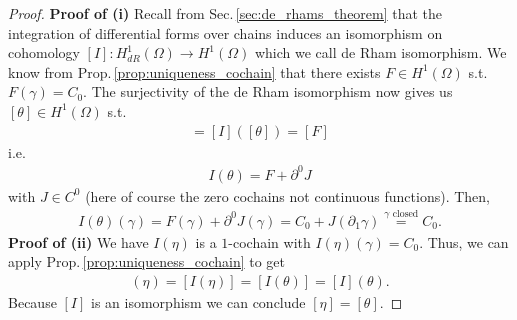 \documentclass[12pt,a4paper]{article}
\numberwithin{equation}{subsection}
\numberwithin{lemma}{subsection}
\theoremstyle{definition}
\begin{document}
\begin{proof}
    \textbf{Proof of (i)}
    Recall from Sec.\,\ref{sec:de_rhams_theorem} 
    that the integration of differential forms 
    over chains induces an isomorphism on cohomology 
    $[I]: H_{dR}^1(\Omega) \rightarrow H^1(\Omega)$ which we call 
    de Rham isomorphism. We know from 
    Prop.\,\ref{prop:uniqueness_cochain} that there exists $F\in H^1(\Omega)$ 
    s.t. $F(\gamma) = C_0$. The surjectivity of the de Rham isomorphism 
    now gives us $[\theta] \in H^1(\Omega)$ s.t.
    \begin{align*}
        [I(\theta)] = [I]([\theta]) = [F]
    \end{align*}
    i.e.
    \begin{align*}
        I(\theta) = F + \partial^0 J
    \end{align*}
    with $J \in C^0$ (here of course the zero cochains not continuous functions). 
    Then, 
    \begin{align*}
        I(\theta)(\gamma) = F(\gamma) + \partial^0 J(\gamma) 
        = C_0 + J(\partial_1 \gamma) 
        \stackrel{\text{$\gamma$ closed}}{=} C_0. 
    \end{align*}
    \textbf{Proof of (ii)}
    We have $I(\eta)$ is a $1$-cochain with $I(\eta)(\gamma) = C_0$.
    Thus, we can apply Prop.\,\ref{prop:uniqueness_cochain} to get
    \begin{align*}
        [I](\eta)=[I(\eta)] = [I(\theta)]=[I](\theta).
    \end{align*}
    Because $[I]$ is an isomorphism we can conclude $[\eta] = [\theta]$.
\end{proof}
\end{document}
